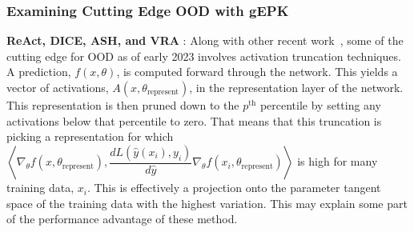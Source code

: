 \begin{frame}
  \frametitle{Examining Cutting Edge OOD with gEPK}
  \textbf{ReAct, DICE, ASH, and VRA} : 
 Along with other recent work~\citep{sun2021, sun2022, xu2023vra},
 some of the cutting edge for OOD as of early 2023 involves activation
 truncation techniques. 
 A prediction, $f(x, \theta)$, is computed forward through the
 network. This yields a vector of activations, $A(x,
 \theta_{\text{represent}})$, in the representation layer of the
 network. This representation is then pruned down to the
 $p^{\text{th}}$ percentile by setting any activations below that
 percentile to zero.
 That means that this truncation is picking a representation for which $\left\langle \nabla_\theta f(x, \theta_{\text{represent}}), \dfrac{dL(\hat y(x_i), y_i)}{d\hat y} \nabla_\theta f(x_i, \theta_{\text{represent}}) \right\rangle$ is high for many training data, $x_i$. This is effectively a projection onto the parameter tangent space of the training data with the highest variation. This may explain some part of the performance advantage of these method. 
\end{frame}

